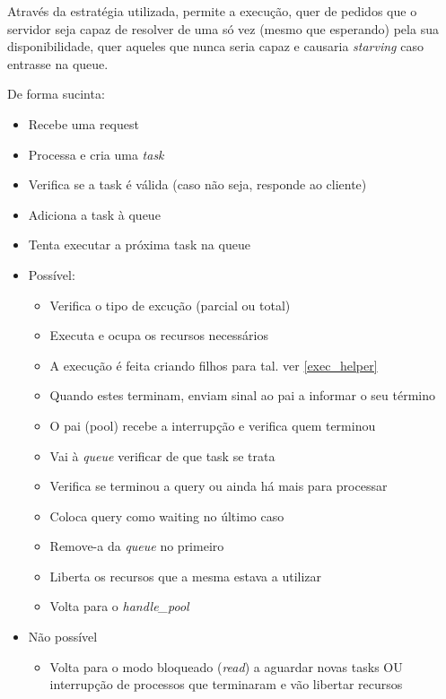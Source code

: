 \documentclass[11pt]{article}
\begin{document}
Através da estratégia utilizada, permite a execução, quer de pedidos que o servidor seja capaz de resolver de uma só vez (mesmo que esperando)
pela sua disponibilidade, quer aqueles que nunca seria capaz e causaria \textit{starving} caso entrasse na queue.

De forma sucinta:
\begin{itemize}
    \item Recebe uma request
    \item Processa e cria uma \textit{task}
    \item Verifica se a task é válida (caso não seja, responde ao cliente)
    \item Adiciona a task à queue
    \item Tenta executar a próxima task na queue
    \item Possível:
          \begin{itemize}
              \item Verifica o tipo de excução (parcial ou total)
              \item Executa e ocupa os recursos necessários
              \item A execução é feita criando filhos para tal. ver \ref{exec_helper}
              \item Quando estes terminam, enviam sinal ao pai a informar o seu término
              \item O pai (pool) recebe a interrupção e verifica quem terminou
              \item Vai à \textit{queue} verificar de que task se trata
              \item Verifica se terminou a query ou ainda há mais para processar
              \item Coloca query como waiting no último caso
              \item Remove-a da \textit{queue} no primeiro
              \item Liberta os recursos que a mesma estava a utilizar
              \item Volta para o \textit{handle\_pool}
          \end{itemize}
    \item Não possível
          \begin{itemize}
              \item Volta para o modo bloqueado (\textit{read}) a aguardar novas tasks OU interrupção de processos que terminaram e vão libertar recursos
          \end{itemize}
\end{itemize}
\end{document}
